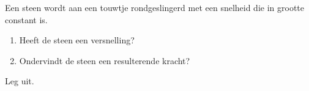 


\item Een steen wordt aan een touwtje rondgeslingerd met een snelheid die in grootte constant is. 

\begin{enumerate}
	\item{}Heeft de steen een versnelling?
	\item{}Ondervindt de steen een resulterende kracht?
\end{enumerate}

Leg uit.
